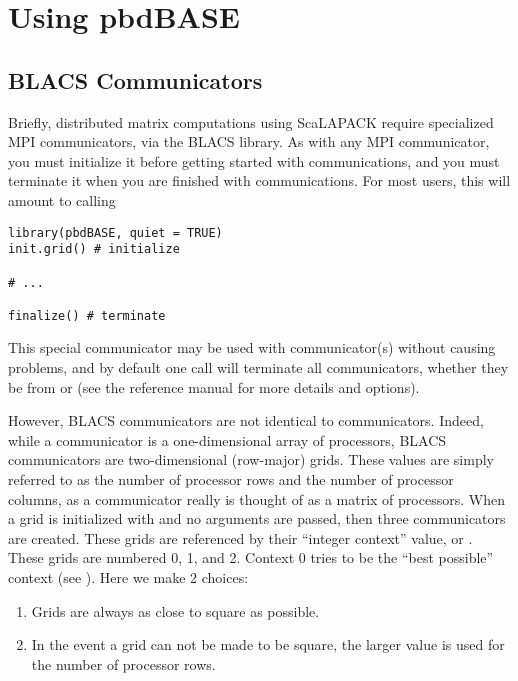 \section{Using pbdBASE}


\subsection{BLACS Communicators}

Briefly, distributed matrix computations using ScaLAPACK require specialized MPI communicators, via the BLACS library.  As with any MPI communicator, you must initialize it before getting started with communications, and you must terminate it when you are finished with communications.  For most users, this will amount to calling

\begin{lstlisting}[language=rr]
library(pbdBASE, quiet = TRUE)
init.grid() # initialize

# ...

finalize() # terminate
\end{lstlisting}

This special communicator may be used with  communicator(s) without causing problems, and by default one  call will terminate all communicators, whether they be from  or  (see the  reference manual for more details and options).  

However, BLACS communicators are not identical to  communicators.  Indeed, while a  communicator is a one-dimensional array of processors, BLACS communicators are two-dimensional (row-major) grids.  These values are simply referred to as the number of processor rows and the number of processor columns, as a communicator really is thought of as a matrix of processors.  When a grid is initialized with  and no arguments are passed, then three communicators are created.  These grids are referenced by their ``integer context'' value, or .  These grids are numbered 0, 1, and 2.  Context 0 tries to be the ``best possible'' context (see \citep{slug}).  Here we make 2 choices:
\begin{enumerate}
  \item Grids are always as close to square as possible.  
  \item In the event a grid can not be made to be square, the larger value is used for the number of processor rows.
\end{enumerate}

